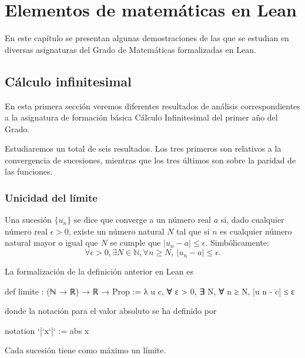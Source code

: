 \chapter{Elementos de matemáticas en Lean}

En este capítulo se presentan algunas demostraciones de las que se
estudian en diversas asignaturas del Grado de Matemáticas formalizadas en Lean.

\section{Cálculo infinitesimal}
En esta primera sección veremos diferentes resultados de análisis 
correspondientes a la asignatura de formación básica Cálculo Infinitesimal 
del primer año del Grado.

Estudiaremos un total de seis resultados. Los tres primeros son relativos 
a la convergencia de sucesiones, mientras que los tres últimos son sobre 
la paridad de las funciones.

\subsection{Unicidad del límite}

\begin{definicion}\label{limite}
	Una sucesión \(\{ u_n\} \) se dice que converge a un número real \(a\) si, 
	dado cualquier número real \(\epsilon > 0\), existe un número natural \(N\) 
	tal que si \(n\) es cualquier número natural mayor o igual que \(N\) se 
	cumple que \(|u_n-a| \leq \epsilon\). Simbólicamente: 
	\begin{equation}
	\forall \epsilon >0, \exists N \in \mathbb{N}, \forall n \geq N, \ 
	|u_n-a| \leq \epsilon.
	\end{equation}
\end{definicion}
\newpage 
La formalización de la definición anterior en Lean es
\begin{leancode}
def limite : (ℕ → ℝ) → ℝ → Prop :=
λ u c, ∀ ε > 0, ∃ N, ∀ n ≥ N, |u n - c| ≤ ε
\end{leancode}
donde la notación para el valor absoluto se ha definido por
\begin{leancode}
notation `|`x`|` := abs x
\end{leancode}

\begin{teorema}
Cada sucesión tiene como máximo un límite.
\end{teorema}

